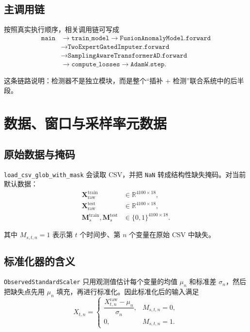 \documentclass[UTF8]{ctexart}
\begin{document}
\subsection{主调用链}

按照真实执行顺序，相关调用链可写成
\begin{equation}
    \begin{aligned}
        \texttt{main}
        &\rightarrow \texttt{train\_model}
        \rightarrow \texttt{FusionAnomalyModel.forward} \\
        &\rightarrow \texttt{TwoExpertGatedImputer.forward} \\
        &\rightarrow \texttt{SamplingAwareTransformerAD.forward} \\
        &\rightarrow \texttt{compute\_losses}
        \rightarrow \texttt{AdamW.step}.
    \end{aligned}
\end{equation}

这条链路说明：检测器不是独立模块，而是整个“插补 + 检测”联合系统中的后半段。

\section{数据、窗口与采样率元数据}

\subsection{原始数据与掩码}

\texttt{load\_csv\_glob\_with\_mask} 会读取 CSV，并把 \texttt{NaN} 转成结构性缺失掩码。对当前默认数据：
\begin{align}
    \bm{X}^{\text{train}}_{\text{raw}} &\in \mathbb{R}^{4100 \times 18}, \\
    \bm{X}^{\text{test}}_{\text{raw}} &\in \mathbb{R}^{4100 \times 18}, \\
    \bm{M}^{\text{train}}_s,\bm{M}^{\text{test}}_s &\in \{0,1\}^{4100 \times 18}.
\end{align}

其中 \(M_{s,t,n}=1\) 表示第 \(t\) 个时间步、第 \(n\) 个变量在原始 CSV 中缺失。

\subsection{标准化器的含义}

\texttt{ObservedStandardScaler} 只用观测值估计每个变量的均值 \(\mu_n\) 和标准差 \(\sigma_n\)，然后把缺失点先用 \(\mu_n\) 填充，再进行标准化。因此标准化后的输入满足
\begin{equation}
    X_{t,n} =
    \begin{cases}
        \dfrac{X^{\text{raw}}_{t,n} - \mu_n}{\sigma_n}, & M_{s,t,n}=0, \\[6pt]
        0, & M_{s,t,n}=1.
    \end{cases}
\end{equation}
\end{document}
